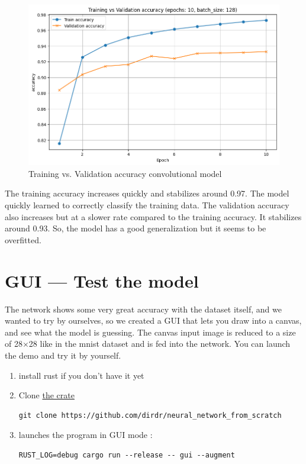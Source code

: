 \documentclass[a4paper, twocolumn, twoside]{article}
\begin{document}
	\begin{figure}[H]
		\begin{center}
			\includegraphics[width=\columnwidth]{images/accuracy_conv.png}
		\end{center}
		\caption{Training vs. Validation accuracy convolutional model}\label{fig:accuracy_conv}
	\end{figure}

    The training accuracy increases quickly and stabilizes around 0.97. The model quickly learned to correctly classify the training data.
    The validation accuracy also increases but at a slower rate compared to the training accuracy. It stabilizes around 0.93.
    So, the model has a good generalization but it seems to be overfitted.

	\onecolumn
	\section{GUI — Test the model}
	The network shows some very great accuracy with the dataset itself, and we wanted to try by ourselves,
	so we created a GUI that lets you draw into a canvas, and see what the model is guessing.
	The canvas input image is reduced to a size of 28×28 like in the mnist dataset and is fed into the network.
	You can launch the demo and try it by yourself.
	\begin{enumerate}
		\item install rust if you don't have it yet
		\item Clone \href{https://github.com/dirdr/neural_network_from_scratch}{the crate}\\
\begin{verbatim}
git clone https://github.com/dirdr/neural_network_from_scratch
\end{verbatim}
		\item launches the program in GUI mode : 
\begin{verbatim}
RUST_LOG=debug cargo run --release -- gui --augment
\end{verbatim}
	\end{enumerate}
\end{document}
